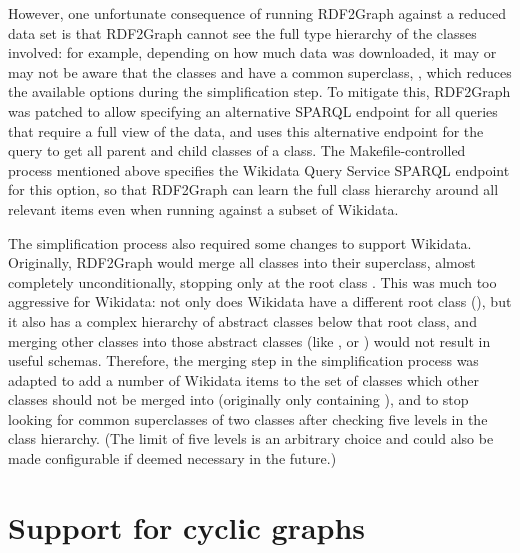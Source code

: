 However, one unfortunate consequence of running RDF2Graph against a reduced data set
is that RDF2Graph cannot see the full type hierarchy of the classes involved:
for example, depending on how much data was downloaded,
it may or may not be aware that the classes  and 
have a common superclass, ,
which reduces the available options during the simplification step. %
To mitigate this, RDF2Graph was patched %
to allow specifying an alternative SPARQL endpoint for all queries that require a full view of the data,
and uses this alternative endpoint for the query to get all parent and child classes of a class.
The Makefile-controlled process mentioned above %
specifies the Wikidata Query Service SPARQL endpoint for this option,
so that RDF2Graph can learn the full class hierarchy around all relevant items %
even when running against a subset of Wikidata. %

The simplification process also required some changes to support Wikidata.
Originally, RDF2Graph would merge all classes into their superclass,
almost completely unconditionally,
stopping only at the root class .
This was much too aggressive for Wikidata:
not only does Wikidata have a different root class (),
but it also has a complex hierarchy of abstract classes below that root class,
and merging other classes into those abstract classes
(like ,  or )
would not result in useful schemas.
Therefore, the merging step in the simplification process was adapted %
to add a number of Wikidata items to the set of classes which other classes should not be merged into
(originally only containing ),
and to stop looking for common superclasses of two classes after checking five levels in the class hierarchy.
(The limit of five levels is an arbitrary choice
and could also be made configurable if deemed necessary in the future.) %

\section{Support for cyclic graphs}
\label{sec:RDF2Graph+Wikidata:cyclic-graphs}

